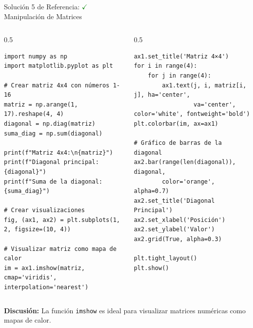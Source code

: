 \documentclass[10pt]{beamer}
\begin{document}
\begin{frame}[fragile]{Solución 5 de Referencia: \hfill \textcolor{green}{$\checkmark$} \\ Manipulación de Matrices}
\begin{columns}
\begin{column}{0.5\textwidth}
\begin{verbatim}
import numpy as np
import matplotlib.pyplot as plt

# Crear matriz 4x4 con números 1-16
matriz = np.arange(1, 17).reshape(4, 4)
diagonal = np.diag(matriz)
suma_diag = np.sum(diagonal)

print(f"Matriz 4x4:\n{matriz}")
print(f"Diagonal principal: {diagonal}")
print(f"Suma de la diagonal: {suma_diag}")

# Crear visualizaciones
fig, (ax1, ax2) = plt.subplots(1, 2, figsize=(10, 4))

# Visualizar matriz como mapa de calor
im = ax1.imshow(matriz, cmap='viridis', interpolation='nearest')
\end{verbatim}
\end{column}
\begin{column}{0.5\textwidth}
\begin{verbatim}
ax1.set_title('Matriz 4×4')
for i in range(4):
    for j in range(4):
        ax1.text(j, i, matriz[i, j], ha='center', 
                 va='center', color='white', fontweight='bold')
plt.colorbar(im, ax=ax1)

# Gráfico de barras de la diagonal
ax2.bar(range(len(diagonal)), diagonal, 
        color='orange', alpha=0.7)
ax2.set_title('Diagonal Principal')
ax2.set_xlabel('Posición')
ax2.set_ylabel('Valor')
ax2.grid(True, alpha=0.3)

plt.tight_layout()
plt.show()
\end{verbatim}
\end{column}
\end{columns}
\vspace{0.3cm}
\textbf{Discusión:} La función \texttt{imshow} es ideal para visualizar matrices numéricas como mapas de calor.
\end{frame}
\end{document}
